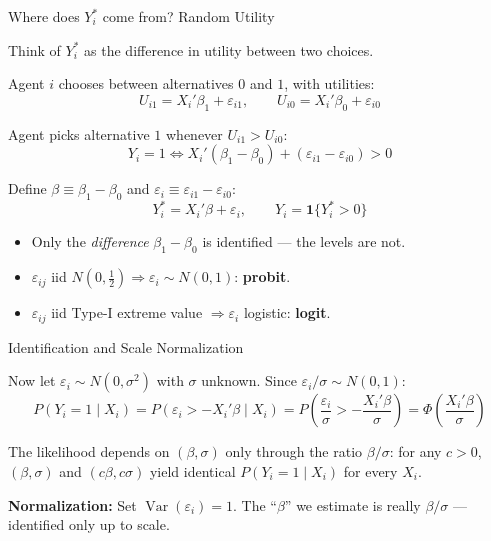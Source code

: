 \documentclass[aspectratio=169, handout, t]{beamer}
\numberwithin{equation}{section}
\begin{document}

\begin{frame}{Where does $Y_i^*$ come from? Random Utility}

Think of $Y_i^*$ as the difference in utility between two choices.

\pause

Agent $i$ chooses between alternatives $0$ and $1$, with utilities:
\[
U_{i1} = X_i'\beta_1 + \varepsilon_{i1}, \qquad
U_{i0} = X_i'\beta_0 + \varepsilon_{i0}
\]

\pause

Agent picks alternative $1$ whenever $U_{i1} > U_{i0}$:
\[
Y_i = 1 \iff X_i'(\beta_1 - \beta_0) + (\varepsilon_{i1} - \varepsilon_{i0}) > 0
\]

\pause

Define $\beta \equiv \beta_1 - \beta_0$ and $\varepsilon_i \equiv \varepsilon_{i1} - \varepsilon_{i0}$:
\[
Y_i^* = X_i'\beta + \varepsilon_i, \qquad Y_i = \mathbf{1}\{Y_i^* > 0\}
\]

\pause

\begin{itemize}
  \item Only the \emph{difference} $\beta_1 - \beta_0$ is identified --- the levels are not.
  \item $\varepsilon_{ij}$ iid $N(0, \tfrac{1}{2}) \Rightarrow \varepsilon_i \sim N(0,1)$: \textbf{probit}.
  \item $\varepsilon_{ij}$ iid Type-I extreme value $\Rightarrow \varepsilon_i$ logistic: \textbf{logit}.
\end{itemize}

\end{frame}


\begin{frame}{Identification and Scale Normalization}

Now let $\varepsilon_i \sim N(0, \sigma^2)$ with $\sigma$ unknown. Since $\varepsilon_i/\sigma \sim N(0,1)$:
\pause
\[
P(Y_i=1 \mid X_i)
= P\!\left(\varepsilon_i > -X_i'\beta \mid X_i\right)
= P\!\left(\frac{\varepsilon_i}{\sigma} > -\frac{X_i'\beta}{\sigma}\right)
= \Phi\!\left(\frac{X_i'\beta}{\sigma}\right)
\]

\pause

The likelihood depends on $(\beta, \sigma)$ only through the ratio $\beta/\sigma$: for any $c>0$, $(\beta,\sigma)$ and $(c\beta, c\sigma)$ yield identical $P(Y_i=1 \mid X_i)$ for every $X_i$.

\pause

\textbf{Normalization:} Set $\operatorname{Var}(\varepsilon_i) = 1$. The ``$\beta$'' we estimate is really $\beta/\sigma$ --- identified only up to scale.

\end{frame}
\end{document}

